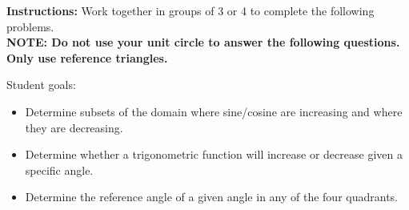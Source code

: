 



\noindent \textbf{Instructions:}  Work together in groups of  3 or 4 to complete the following problems.\\
\noindent \textbf{NOTE:  Do not use your unit circle to answer the following questions.  Only use reference triangles.}

Student goals:
\begin{itemize}
\item Determine subsets of the domain where sine/cosine are increasing
  and where they are decreasing.
\item Determine whether a trigonometric function will increase or
  decrease given a specific angle.
\item Determine the reference angle of a given angle in any of the
  four quadrants.
\end{itemize}



